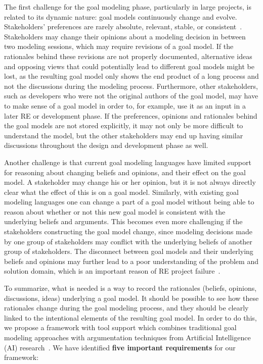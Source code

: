 The first challenge for the goal modeling phase, particularly in large projects, is related to its dynamic nature: goal models continuously change and evolve. Stakeholders' preferences are rarely absolute, relevant, stable, or consistent~\cite{march1978bounded}. Stakeholders may change their opinions about a modeling decision in between two modeling sessions, which may require revisions of a goal model. If the rationales behind these revisions are not properly documented, alternative ideas and opposing views that could potentially lead to different goal models might be lost, as the resulting goal model only shows the end product of a long process and not the discussions during the modeling process. Furthermore, other stakeholders, such as developers who were not the original authors of the goal model, may have to make sense of a goal model in order to, for example, use it as an input in a later RE or development phase. If the preferences, opinions and rationales behind the goal models are not stored explicitly, it may not only be more difficult to understand the model, but the other stakeholders may end up having similar discussions throughout the design and development phase as well.

Another challenge is that current goal modeling languages have limited support for reasoning about changing beliefs and opinions, and their effect on the goal model. A stakeholder may change his or her opinion, but it is not always directly clear what the effect of this is on a goal model. Similarly, with existing goal modeling languages one can change a part of a goal model without being able to reason about whether or not this new goal model is consistent with the underlying beliefs and arguments. This becomes even more challenging if the stakeholders constructing the goal model change, since modeling decisions made by one group of stakeholders may conflict with the underlying beliefs of another group of stakeholders. The disconnect between goal models and their underlying beliefs and opinions may further lead to a poor understanding of the problem and solution domain, which is an important reason of RE project failure~\cite{curtis1988field}. 

To summarize, what is needed is a way to record the rationales (beliefs, opinions, discussions, ideas) underlying a goal model. It should be possible to see how these rationales change during the goal modeling process, and they  should be clearly linked to the intentional elements of the resulting goal model. In order to do this, we propose a framework with tool support which combines traditional goal modeling approaches with argumentation techniques from Artificial Intelligence (AI) research~\cite{BenchCaponDunne2007}. We have identified \textbf{five important requirements} for our framework: 


